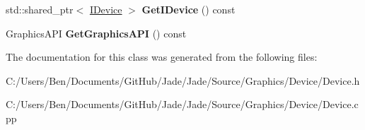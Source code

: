 \begin{DoxyCompactItemize}
\item 
\hypertarget{class_jade_1_1_graphics_1_1_device_a635de94382dbe1b6072d34bbc3222616}{}std\+::shared\+\_\+ptr$<$ \hyperlink{struct_jade_1_1_graphics_1_1_i_device}{I\+Device} $>$ {\bfseries Get\+I\+Device} () const \label{class_jade_1_1_graphics_1_1_device_a635de94382dbe1b6072d34bbc3222616}

\item 
\hypertarget{class_jade_1_1_graphics_1_1_device_add64b3329cc1039e842f4b9f67b7110d}{}Graphics\+A\+P\+I {\bfseries Get\+Graphics\+A\+P\+I} () const \label{class_jade_1_1_graphics_1_1_device_add64b3329cc1039e842f4b9f67b7110d}

\end{DoxyCompactItemize}


The documentation for this class was generated from the following files\+:\begin{DoxyCompactItemize}
\item 
C\+:/\+Users/\+Ben/\+Documents/\+Git\+Hub/\+Jade/\+Jade/\+Source/\+Graphics/\+Device/Device.\+h\item 
C\+:/\+Users/\+Ben/\+Documents/\+Git\+Hub/\+Jade/\+Jade/\+Source/\+Graphics/\+Device/Device.\+cpp\end{DoxyCompactItemize}
